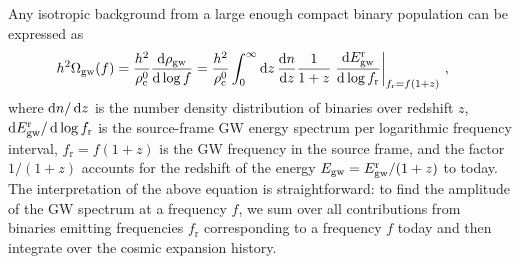 Any isotropic background from a large enough compact binary population can be expressed as~\cite{Maggiore:2018sht}
\begin{align}
	h^2 \Omega_{\text{gw}}(f) &= \frac{h^2}{\rho_{\text{c}}^0} \frac{\mathrm d \rho_{\text{gw}}}{\mathrm d \log f} = \frac{h^2}{\rho_{\text{c}}^0} \int_0^\infty \mathop{}\!\mathrm{d} z \, \frac{\mathrm d n}{\mathrm d z} \frac{1}{1 + z} \left.\frac{\mathrm d E_{\text{gw}}^\text{r}}{\mathrm d \log f_\text{r}} \right|_{f_\text{r} = f(1 + z)} \, , \label{eq:binaryGW}
\end{align}
where $\mathop{}\!\mathrm{d} n / \mathop{}\!\mathrm{d} z$ is the number density distribution of binaries over redshift $z$, $\mathop{}\!\mathrm{d} E_{\text{gw}}^\text{r} / \mathop{}\!\mathrm{d} \log f_\text{r}$ is the  source-frame \ac{GW} energy spectrum per logarithmic frequency interval, $f_\text{r} = f(1+z)$ is the \ac{GW} frequency in the source frame, and the factor $1/(1+z)$ accounts for the redshift of the energy $E_{\text{gw}} = E_{\text{gw}}^\text{r}/(1 + z) $ to today. The interpretation of the above equation is straightforward: to find the amplitude of the  \ac{GW} spectrum at a frequency $f$, we sum over all contributions from binaries emitting frequencies $f_\text{r}$ corresponding to a frequency $f$ today and then integrate over the cosmic expansion history.

